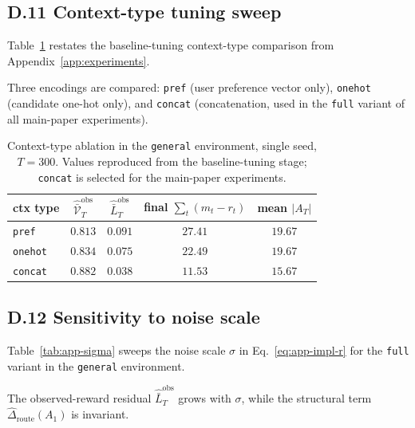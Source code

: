 \documentclass{article} %
\begin{document}
\subsection{D.11 Context-type tuning sweep}

\label{app:tab-ctx}

Table~\ref{tab:app-ctx} restates the baseline-tuning context-type comparison from Appendix~\ref{app:experiments}.

Three encodings are compared: \texttt{pref} (user preference vector only), \texttt{onehot} (candidate one-hot only), and \texttt{concat} (concatenation, used in the \texttt{full} variant of all main-paper experiments).

\begin{table}[h]
\centering
\small
\begin{tabular}{lcccc}
\toprule
ctx type & $\widehat{\bar{\mathcal V}}_T^{\mathrm{obs}}$ & $\widehat{\bar L}_T^{\mathrm{obs}}$ & final $\sum_t(m_t-r_t)$ & mean $|A_T|$ \\
\midrule
\texttt{pref}   & $0.813$ & $0.091$ & $27.41$ & $19.67$ \\
\texttt{onehot} & $0.834$ & $0.075$ & $22.49$ & $19.67$ \\
\texttt{concat} & $0.882$ & $0.038$ & $11.53$ & $15.67$ \\
\bottomrule
\end{tabular}
\caption{Context-type ablation in the \texttt{general} environment, single seed, $T=300$. Values reproduced from the baseline-tuning stage; \texttt{concat} is selected for the main-paper experiments.}
\label{tab:app-ctx}
\end{table}

\subsection{D.12 Sensitivity to noise scale}

\label{app:tab-sigma}

Table~\ref{tab:app-sigma} sweeps the noise scale \(\sigma\) in
Eq.~\eqref{eq:app-impl-r} for the \texttt{full} variant in the
\texttt{general} environment.

The observed-reward residual
\(\widehat{\bar L}_T^{\mathrm{obs}}\) grows with \(\sigma\), while the
structural term \(\widehat\Delta_{\mathrm{route}}(A_1)\) is invariant.
\end{document}
